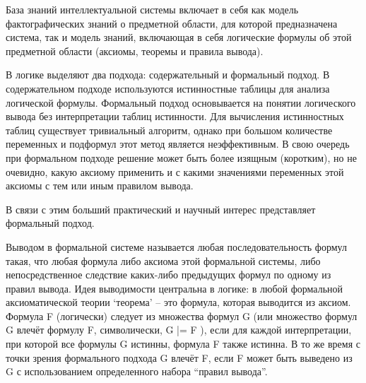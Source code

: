 База знаний интеллектуальной системы включает в себя как модель фактографических знаний о предметной области, для которой предназначена система, так и модель знаний, включающая в себя логические формулы об этой предметной области (аксиомы, теоремы и правила вывода).

В логике выделяют два подхода: содержательный и формальный подход. В содержательном подходе используются истинностные таблицы для анализа логической формулы. Формальный подход основывается на понятии логического вывода без интерпретации таблиц истинности. Для вычисления истинностных таблиц существует тривиальный алгоритм, однако при большом количестве переменных и подформул этот метод является неэффективным. В свою очередь при формальном подходе решение может быть более изящным (коротким), но не очевидно, какую аксиому применить и с какими значениями переменных этой аксиомы с тем или иным правилом вывода.

В связи с этим больший практический и научный интерес представляет формальный подход.

Выводом в формальной системе называется любая последовательность формул такая, что любая формула либо аксиома этой формальной системы, либо непосредственное следствие каких-либо предыдущих формул по одному из правил вывода.
Идея выводимости центральна в логике: в любой формальной аксиоматической теории `теорема' – это формула, которая выводится из аксиом.
Формула F (логически) следует из множества формул G (или множество формул G влечёт формулу F, символически, G |= F ), если для каждой интерпретации, при которой все формулы G истинны, формула F также истинна. В то же время с точки зрения формального подхода G влечёт F, если F может быть выведено из G с использованием определенного набора ``правил вывода''.

